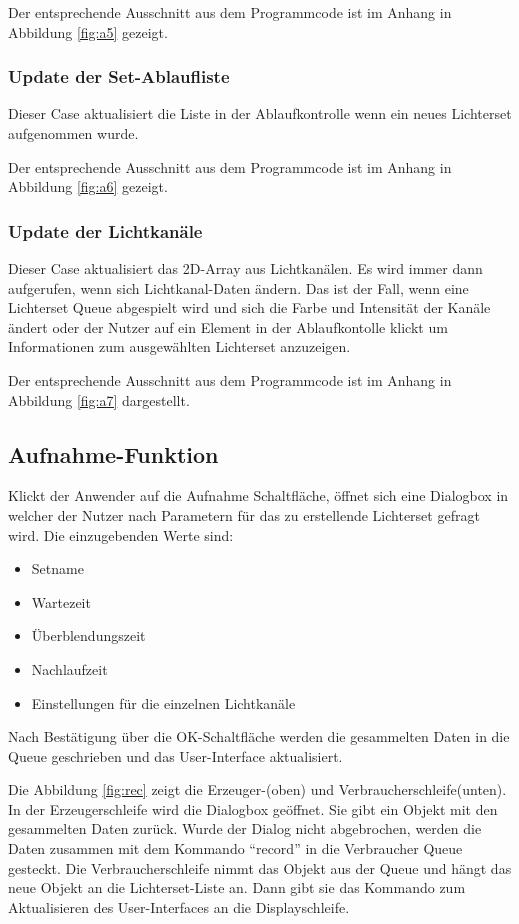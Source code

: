 Der entsprechende Ausschnitt aus dem Programmcode ist im Anhang in Abbildung \ref{fig:a5} gezeigt.

\subsubsection{Update der Set-Ablaufliste}
Dieser Case aktualisiert die Liste in der Ablaufkontrolle wenn ein neues Lichterset aufgenommen wurde.

Der entsprechende Ausschnitt aus dem Programmcode ist im Anhang in Abbildung \ref{fig:a6} gezeigt.

\subsubsection{Update der Lichtkanäle}
Dieser Case aktualisiert das 2D-Array aus Lichtkanälen. Es wird immer dann aufgerufen, wenn sich Lichtkanal-Daten ändern. 
Das ist der Fall, wenn eine Lichterset Queue abgespielt wird und sich die Farbe und Intensität der Kanäle ändert oder der Nutzer auf ein Element in der Ablaufkontolle klickt
um  Informationen zum ausgewählten Lichterset anzuzeigen.

Der entsprechende Ausschnitt aus dem Programmcode ist im Anhang in Abbildung \ref{fig:a7} dargestellt.


\subsection{Aufnahme-Funktion}	
Klickt der Anwender auf die Aufnahme Schaltfläche, öffnet sich eine Dialogbox in welcher der Nutzer nach Parametern für das zu erstellende Lichterset gefragt wird. 
Die einzugebenden Werte sind:
\begin{itemize}
\item Setname
\item Wartezeit
\item Überblendungszeit
\item Nachlaufzeit
\item Einstellungen für die einzelnen Lichtkanäle
\end{itemize}

Nach Bestätigung über die OK-Schaltfläche werden die gesammelten Daten in die Queue geschrieben und das User-Interface aktualisiert. 

Die Abbildung \ref{fig:rec} zeigt die Erzeuger-(oben) und Verbraucherschleife(unten). In der Erzeugerschleife wird die Dialogbox geöffnet. 
Sie gibt ein Objekt mit den gesammelten Daten zurück. 
Wurde der Dialog nicht abgebrochen, werden die Daten zusammen mit dem Kommando "`record"' in die Verbraucher Queue gesteckt. 
Die Verbraucherschleife nimmt  das Objekt aus der Queue und hängt das neue Objekt an die Lichterset-Liste an. 
Dann gibt sie das Kommando zum Aktualisieren des User-Interfaces an die Displayschleife.

